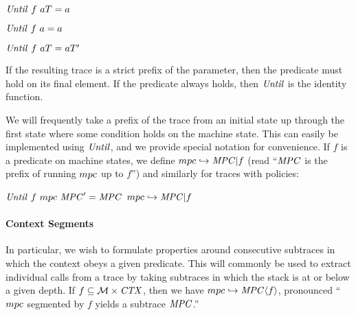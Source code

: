 \documentclass[acmsmall,review,anonymous]{acmart}\settopmatter{printfolios=true,printccs=false,printacmref=false}
\begin{document}
\begin{center}
  \begin{minipage}{.3\textwidth}
             {\(\mathit{Until} ~ f ~ aT = a\)}
  \end{minipage}
%
  \begin{minipage}{.3\textwidth}
    \judgment{}
             {\(\mathit{Until} ~ f ~ a = a\)}
%
  \end{minipage}
  \begin{minipage}{.3\textwidth}
                {\(\mathit{Until} ~ f ~ aT = aT'\)}
  \end{minipage}
\end{center}
%
If the resulting trace is a strict prefix of the parameter, then the
predicate must hold on its final element. If the predicate always holds, then
\(\mathit{Until}\) is the identity function.



We will frequently take a prefix of the trace from an initial state up
through the first state where some condition holds on the machine state.
This can easily be implemented using \(\mathit{Until}\), and we provide special notation
for convenience.
%
If \(f\) is a predicate on machine states, we define \(mpc
\hookrightarrow \mathit{MPC} | f\) (read ``\(\mathit{MPC}\) is the prefix of
running \(mpc\) up to \(f\)'') and similarly for traces with policies:

\begin{center}
            {\(\mathit{Until} ~ f ~ mpc ~ \mathit{MPC}' = \mathit{MPC}\)}
            {\(mpc \hookrightarrow \mathit{MPC} | f\)}
\end{center}

\paragraph*{Context Segments}

In particular, we wish to formulate properties around consecutive subtraces
in which the context obeys a given predicate. This will commonly be used to extract
individual calls from a trace by taking subtraces in which the stack is
at or below a given depth. If \(f \subseteq {\mathcal M} \times \mathit{CTX}\), then
we have \(mpc \hookrightarrow \mathit{MPC} \langle f \rangle\), pronounced
``\(mpc\) segmented by \(f\) yields a subtrace \(\mathit{MPC}\).''
\end{document}
